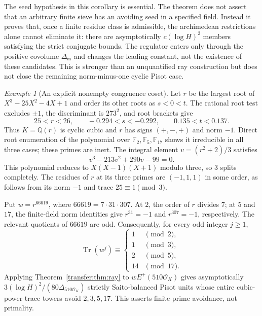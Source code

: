 \documentclass[11pt,a4paper]{article}
\theoremstyle{remark}\newtheorem{remark}[theorem]{Remark}
\newtheorem{example}[theorem]{Example}
\begin{document}
The seed hypothesis in this corollary is essential. The theorem does
not assert that an arbitrary finite sieve has an avoiding seed in a
specified field. Instead it proves that, once a finite residue class
is admissible, the archimedean restrictions alone cannot eliminate it:
there are asymptotically $c(\log H)^2$ members satisfying the strict
conjugate bounds. The regulator enters only through the positive
covolume $\Delta_{\mathfrak m}$ and changes the leading constant,
not the existence of these candidates. This is stronger than an
unquantified ray construction but does not close the remaining
norm-minus-one cyclic Pisot case.


\begin{example}[An explicit nonempty congruence coset]
\label{transfer:ex:seed}
Let $r$ be the largest root of $X^3-25X^2-4X+1$ and order its other
roots as $s<0<t$. The rational root test excludes $\pm1$, the
discriminant is $273^2$, and root brackets give
\[
 25<r<26,\qquad -0.294<s<-0.292,\qquad 0.135<t<0.137.
\]
Thus $K=\mathbb Q(r)$ is cyclic cubic and $r$ has signs $(+,-,+)$
and norm $-1$. Direct root enumeration of the polynomial over
$\mathbb F_2,\mathbb F_5,\mathbb F_{17}$ shows it irreducible in all
three cases; these primes are inert. The integral element
$v=(r^2+2)/3$ satisfies
\[
 v^3-213v^2+290v-99=0.
\]
This polynomial reduces to $X(X-1)(X+1)$ modulo three, so $3$ splits
completely. The residues of $r$ at its three primes are
$(-1,1,1)$ in some order, as follows from its norm $-1$ and trace
$25\equiv1\pmod3$.

Put $w=r^{66619}$, where $66619=7\cdot31\cdot307$.
At $2$, the order of $r$ divides $7$; at $5$ and $17$, the finite-field
norm identities give $r^{31}=-1$ and $r^{307}=-1$, respectively.
The relevant quotients of $66619$ are odd. Consequently, for every
odd integer $j\ge1$,
\[
 \operatorname{Tr}(w^j)\equiv
 \begin{cases}
 1&\pmod2,\\
 1&\pmod3,\\
 2&\pmod5,\\
 14&\pmod{17}.
 \end{cases}
\]
Applying Theorem~\ref{transfer:thm:ray} to
$wE^+(510\mathcal O_K)$ gives asymptotically
$3(\log H)^2/(80\Delta_{510\mathcal O_K})$ strictly Saito-balanced
Pisot units whose entire cubic-power trace towers avoid
$2,3,5,17$. This asserts finite-prime avoidance, not primality.
\end{example}

\end{document}
